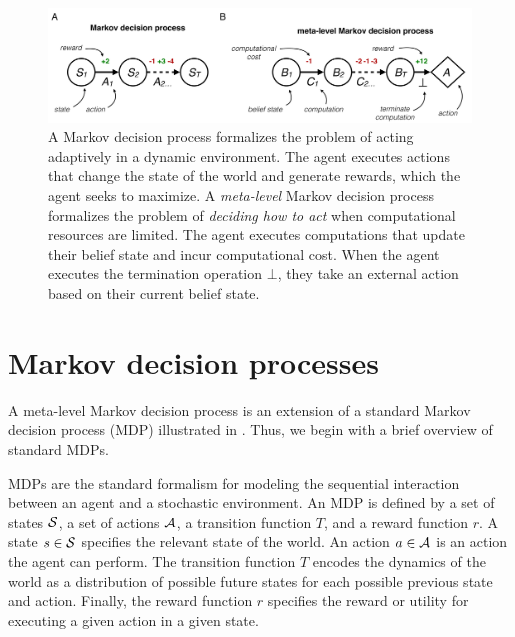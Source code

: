 
\begin{figure}
  \includegraphics[width=\textwidth]{figs/metamdp.pdf}
  \caption{
   A Markov decision process formalizes the problem of acting adaptively in a dynamic environment. The agent executes actions that change the state of the world and generate rewards, which the agent seeks to maximize.
   A \emph{meta-level} Markov decision process formalizes the problem of \emph{deciding how to act} when computational resources are limited. The agent executes computations that update their belief state and incur computational cost. When the agent executes the termination operation $\bot$, they take an external action based on their current belief state.}
  \label{fig:metamdp-diagram}
\end{figure}


\section{Markov decision processes}

A meta-level Markov decision process is an extension of a standard Markov decision process (MDP) illustrated in . Thus, we begin with a brief overview of standard MDPs.

MDPs are the standard formalism for modeling the sequential interaction between an agent and a stochastic environment. An MDP is defined by a set of states $\S$, a set of actions $\A$, a transition function $T$, and a reward function $r$. A state $s \in \S$ specifies the relevant state of the world. An action $a \in \A$ is an action the agent can perform. The transition function $T$ encodes the dynamics of the world as a distribution of possible future states for each possible previous state and action. Finally, the reward function $r$ specifies the reward or utility for executing a given action in a given state.

